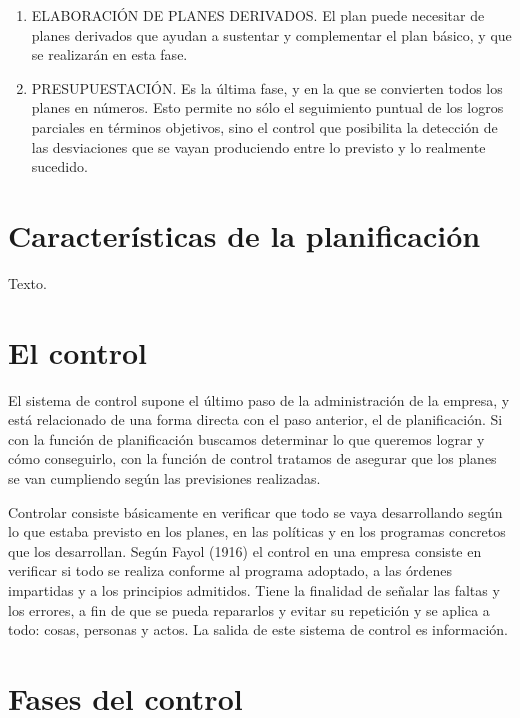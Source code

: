 \documentclass[
]{krantz}
\begin{document}
\begin{enumerate}
\item
  ELABORACIÓN DE PLANES DERIVADOS. El plan puede necesitar de planes derivados que ayudan a sustentar y complementar el plan básico, y que se realizarán en esta fase.
\item
  PRESUPUESTACIÓN. Es la última fase, y en la que se convierten todos los planes en números. Esto permite no sólo el seguimiento puntual de los logros parciales en términos objetivos, sino el control que posibilita la detección de las desviaciones que se vayan produciendo entre lo previsto y lo realmente sucedido.
\end{enumerate}

\hypertarget{caracteruxedsticas-de-la-planificaciuxf3n}{%
\section{Características de la planificación}\label{caracteruxedsticas-de-la-planificaciuxf3n}}

Texto.

\hypertarget{el-control}{%
\section{El control}\label{el-control}}

El sistema de control supone el último paso de la administración de la empresa, y está relacionado de una forma directa con el paso anterior, el de planificación. Si con la función de planificación buscamos determinar lo que queremos lograr y cómo conseguirlo, con la función de control tratamos de asegurar que los planes se van cumpliendo según las previsiones realizadas.

Controlar consiste básicamente en verificar que todo se vaya desarrollando según lo que estaba previsto en los planes, en las políticas y en los programas concretos que los desarrollan. Según Fayol (1916) el control en una empresa consiste en verificar si todo se realiza conforme al programa adoptado, a las órdenes impartidas y a los principios admitidos. Tiene la finalidad de señalar las faltas y los errores, a fin de que se pueda repararlos y evitar su repetición y se aplica a todo: cosas, personas y actos. La salida de este sistema de control es información.

\hypertarget{fases-del-control}{%
\section{Fases del control}\label{fases-del-control}}
\end{document}
